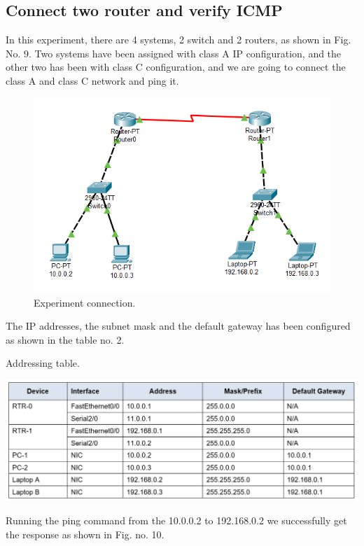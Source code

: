 \documentclass[12pt,a4paper]{article}
\begin{document}
\subsection{Connect two router and verify ICMP}
In this experiment, there are 4 systems, 2 switch and 2 routers, as shown in Fig. No. 9. Two systems have been assigned with class A IP configuration, and the other two has been with class C configuration, and we are going to connect the class A and class C network and ping it.

\begin{figure}[h]
 		\centering
				\includegraphics[scale=0.75]{4.1.png}	


			\caption{Experiment  connection.}
			\label{fig:AP}
	\end{figure}
The IP addresses, the subnet mask and the default gateway has been configured as shown in the table no. 2.
\begin{table}[h!]
\begin{center}
\centering
\caption{Addressing table.}
\includegraphics[scale=0.65]{4.2.png}	
\end{center}
\end{table}
\pagebreak
Running the ping command from the 10.0.0.2 to 192.168.0.2 we successfully get the response as shown in Fig. no. 10.\\
\end{document}
